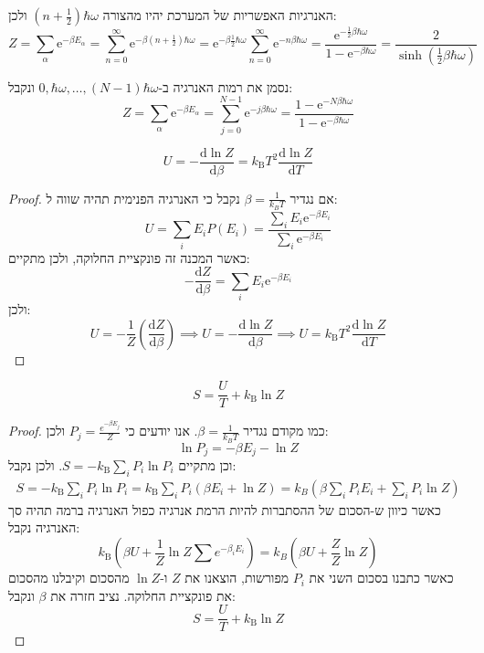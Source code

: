 \documentclass{tstextbook}
\begin{document}
\begin{example}
האנרגיות האפשריות של המערכת יהיו מהצורה \(\left( n+\frac{1}{2} \right)\hbar \omega\) ולכן:
$$Z=\sum_{\alpha}\mathrm{e}^{-\beta E_{\alpha}}=\sum_{n=0}^{\infty}\mathrm{e}^{-\beta\left( n+\frac{1}{2} \right)\hbar\omega}=\mathrm{e}^{-\beta\frac{1}{2}\hbar\omega}\sum_{n=0}^{\infty}\mathrm{e}^{-n\beta\hbar\omega}=\frac{\mathrm{e}^{-\frac{1}{2}\beta\hbar\omega}}{1-\mathrm{e}^{-\beta\hbar\omega}}=\frac{2}{\sinh\left( \frac{1}{2}\beta\hbar \omega \right)}$$

\end{example}
\begin{example}
נסמן את רמות האנרגיה ב-\(0,\hbar {\omega},\dots,(N-1)\hbar \omega\) ונקבל:
$$Z=\sum_{\alpha}\mathrm{e}^{-\beta E_{\alpha}}=\sum_{j=0}^{N-1}\mathrm{e}^{-j\beta\hbar\omega}=\frac{1-\mathrm{e}^{-N\beta\hbar\omega}}{1-\mathrm{e}^{-\beta\hbar\omega}}$$

\end{example}
\begin{proposition}
$$U=-\frac{\mathrm{d} \ln Z}{\mathrm{d} \beta} =k_{\mathrm{B}}T^{2}{\frac{\mathrm{d}\ln Z}{\mathrm{d}T}}$$

\end{proposition}
\begin{proof}
אם נגדיר \(\beta=\frac{1}{k_{B}T}\) נקבל כי האנרגיה הפנימית תהיה שווה ל:
$$U=\sum_{i}E_{i}P(E_{i})=\frac{\sum_{i}E_{i}\mathrm{e}^{-\beta E_{i}}}{\sum_{i}\mathrm{e}^{-\beta E_{i}}}$$
כאשר המכנה זה פונקציית החלוקה, ולכן מתקיים:
$$-{\frac{\mathrm{d}Z}{\mathrm{d}\beta}}=\sum_{i}E_{i}\mathrm{e}^{-\beta E_{i}}$$
ולכן:
$$U=-\frac{1}{Z}\left( \frac{\mathrm{d} Z}{\mathrm{d} \beta}  \right)\implies U=-\frac{\mathrm{d} \ln Z}{\mathrm{d} \beta} \implies U=k_{\mathrm{B}}T^{2}{\frac{\mathrm{d}\ln Z}{\mathrm{d}T}}$$

\end{proof}
\begin{proposition}
$$S={\frac{U}{T}}+k_{\mathrm{B}}\ln Z$$

\end{proposition}
\begin{proof}
כמו מקודם נגדיר \(\beta = \frac{1}{k_{B}T}\). אנו יודעים כי \(P_{j}=\frac{e^{ -\beta E_{j} }}{Z}\) ולכן:
$$\ln{ P}_{j}=-\beta E_{j}-\ln Z$$
וכן מתקיים \(S=-k_{\mathrm{B}}\sum_{i}P_{i}\ln P_{i}\). ולכן נקבל:
\begin{gather*}{{S}}={{-k_{\mathrm{B}}\sum_{i}P_{i}\ln P_{i}}}= k_{\mathrm{B}}\sum_{i}P_{i}\left( \beta E_{i}+\ln Z \right)= k_{B}\left( \beta \sum_{i}P_{i}E_{i}+\sum_{i}P_{i}\ln Z \right)
\end{gather*}
כאשר כיוון ש-הסכום של ההסתברות להיות הרמת אנרגיה כפול האנרגיה ברמה תהיה סך האנרגיה נקבל:
$$k_{\mathrm{{B}}}\left( \beta U+\frac{1}{Z} \ln Z\sum e^{ -\beta_{i}E_{i} } \right) =k_{B}\left( \beta U+ \frac{Z}{Z}\ln Z \right)$$
כאשר כתבנו בסכום השני את \(P_{i}\) מפורשות, הוצאנו את \(Z\) ו-\(\ln Z\) מהסכום וקיבלנו מהסכום את פונקציית החלוקה. נציב חזרה את \(\beta\) ונקבל:
$$S={\frac{U}{T}}+k_{\mathrm{B}}\ln Z$$

\end{proof}
\end{document}
